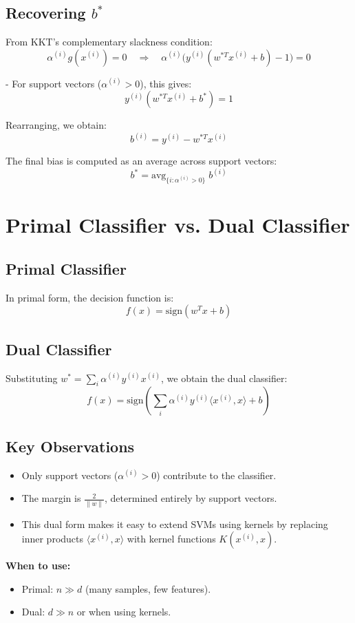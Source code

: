 \documentclass[11pt]{article}
\begin{document}
\subsection*{Recovering $b^*$}
From KKT’s complementary slackness condition:
\[
	\alpha^{(i)} g(x^{(i)}) = 0
	\quad \Rightarrow \quad
	\alpha^{(i)} \Big( y^{(i)} (w^{*T} x^{(i)} + b) - 1 \Big) = 0
\]

- For support vectors ($\alpha^{(i)} > 0$), this gives:
\[
	y^{(i)} (w^{*T} x^{(i)} + b^*) = 1
\]

Rearranging, we obtain:
\[
	b^{(i)} = y^{(i)} - w^{*T} x^{(i)}
\]

The final bias is computed as an average across support vectors:
\[
	b^* = \text{avg}_{\{i : \alpha^{(i)} > 0\}} \; b^{(i)}
\]

\section*{Primal Classifier vs. Dual Classifier}

\subsection*{Primal Classifier}
In primal form, the decision function is:
\[
	f(x) = \text{sign}(w^T x + b)
\]

\subsection*{Dual Classifier}
Substituting $w^* = \sum_i \alpha^{(i)} y^{(i)} x^{(i)}$, we obtain the dual classifier:
\[
	f(x) = \text{sign}\!\left( \sum_i \alpha^{(i)} y^{(i)} \langle x^{(i)}, x \rangle + b \right)
\]

\subsection*{Key Observations}
\begin{itemize}
	\item Only support vectors ($\alpha^{(i)} > 0$) contribute to the classifier.
	\item The margin is $\tfrac{2}{\|w\|}$, determined entirely by support vectors.
	\item This dual form makes it easy to extend SVMs using kernels by replacing inner products $\langle x^{(i)}, x \rangle$ with kernel functions $K(x^{(i)}, x)$.
\end{itemize}

\textbf{When to use:}
\begin{itemize}
	\item Primal: $n \gg d$ (many samples, few features).
	\item Dual: $d \gg n$ or when using kernels.
\end{itemize}
\end{document}
